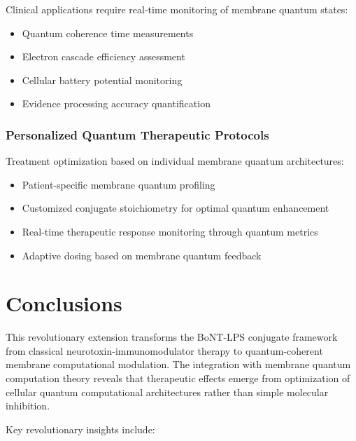 \documentclass[11pt,a4paper]{article}
\begin{document}
Clinical applications require real-time monitoring of membrane quantum states:
\begin{itemize}
\item Quantum coherence time measurements
\item Electron cascade efficiency assessment
\item Cellular battery potential monitoring
\item Evidence processing accuracy quantification
\end{itemize}

\subsubsection{Personalized Quantum Therapeutic Protocols}

Treatment optimization based on individual membrane quantum architectures:
\begin{itemize}
\item Patient-specific membrane quantum profiling
\item Customized conjugate stoichiometry for optimal quantum enhancement
\item Real-time therapeutic response monitoring through quantum metrics
\item Adaptive dosing based on membrane quantum feedback
\end{itemize}

\section{Conclusions}

This revolutionary extension transforms the BoNT-LPS conjugate framework from classical neurotoxin-immunomodulator therapy to quantum-coherent membrane computational modulation. The integration with membrane quantum computation theory reveals that therapeutic effects emerge from optimization of cellular quantum computational architectures rather than simple molecular inhibition.

Key revolutionary insights include:
\end{document}
